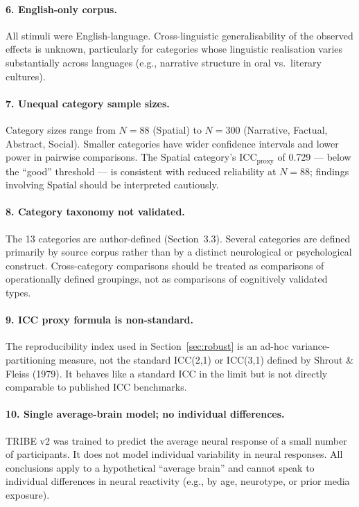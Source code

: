\documentclass[11pt,letterpaper]{article}
\numberwithin{equation}{section}
\begin{document}
\paragraph{6. English-only corpus.} All stimuli were English-language. Cross-linguistic generalisability of the observed effects is unknown, particularly for categories whose linguistic realisation varies substantially across languages (e.g., narrative structure in oral vs.\ literary cultures).

\paragraph{7. Unequal category sample sizes.} Category sizes range from $N=88$ (Spatial) to $N=300$ (Narrative, Factual, Abstract, Social). Smaller categories have wider confidence intervals and lower power in pairwise comparisons. The Spatial category's ICC$_{\text{proxy}}$ of 0.729 --- below the ``good'' threshold --- is consistent with reduced reliability at $N=88$; findings involving Spatial should be interpreted cautiously.

\paragraph{8. Category taxonomy not validated.} The 13 categories are author-defined (Section~3.3). Several categories are defined primarily by source corpus rather than by a distinct neurological or psychological construct. Cross-category comparisons should be treated as comparisons of operationally defined groupings, not as comparisons of cognitively validated types.

\paragraph{9. ICC proxy formula is non-standard.} The reproducibility index used in Section~\ref{sec:robust} is an ad-hoc variance-partitioning measure, not the standard ICC(2,1) or ICC(3,1) defined by Shrout \& Fleiss (1979). It behaves like a standard ICC in the limit but is not directly comparable to published ICC benchmarks.

\paragraph{10. Single average-brain model; no individual differences.} TRIBE v2 was trained to predict the average neural response of a small number of participants. It does not model individual variability in neural responses. All conclusions apply to a hypothetical ``average brain'' and cannot speak to individual differences in neural reactivity (e.g., by age, neurotype, or prior media exposure).
\end{document}
